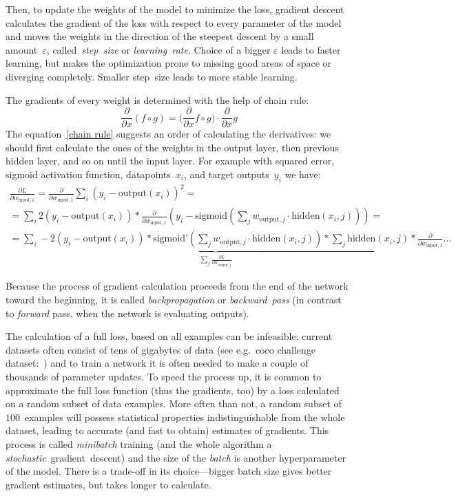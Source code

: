Then, to update the weights of the model to minimize the loss, gradient descent calculates the gradient of the loss with respect to every parameter of the model and moves the weights in the direction of the steepest descent by a small amount~$\varepsilon$, called~\emph{step~size} or \emph{learning~rate}. Choice of a bigger $\varepsilon$ leads to faster learning, but makes the optimization prone to missing good areas of space or diverging completely. Smaller step~size leads to more stable
learning.

The gradients of every weight is determined with the help of chain rule:
\begin{equation}\label{chain rule}
  \frac{\partial}{\partial x} (f \circ g) = (\frac{\partial}{\partial x} f \circ g\big) \cdot \frac{\partial}{\partial x}g
\end{equation}
The equation~\eqref{chain rule} suggests an order of calculating the derivatives: we should first calculate the ones of the weights in the output layer, then previous hidden layer, and so on until the input layer. For example with squared error, sigmoid activation function, datapoints~$x_i$, and target outputs~$y_i$ we have:
\begin{multline}
  \frac{\partial L}{\partial w_{\text{input}, 1}} = \frac{\partial}{\partial w_{\text{input}, 1}} \sum_{i} (y_i - \text{output}(x_i))^2 =\\=  \sum_{i} 2(y_i - \text{output}(x_i)) * \frac{\partial}{\partial w_{\text{input}, 1}}
  ( y_i - \text{sigmoid}(\sum_j w_{\text{output}, j} \cdot \text{hidden}(x_i, j))) =\\=
  \underbrace{\sum_{i} -2(y_i - \text{output}(x_i)) * \text{sigmoid'}(\sum_j w_{\text{output}, j} \cdot \text{hidden}(x_i, j)) * \sum_j \text{hidden}(x_i, j)}_{\sum_j \frac{\partial L}{\partial w_{\text{output}, j}}} * \frac{\partial}{\partial w_{\text{input}, 1}}\ldots
\end{multline}

Because the process of gradient calculation proceeds from the end of the network toward the beginning, it is called \emph{backpropagation} or \emph{backward~pass} (in contrast to \emph{forward} pass, when the network is evaluating outputs).

The calculation of a full loss, based on all examples can be infeasible: current datasets often consist of tens of gigabytes of data (see e.g.~coco challenge dataset:~\cite{coco-dataset}) and to train a network it is often needed to make a couple of thousands of parameter updates.
To speed the process up, it is common to approximate the full loss function (thus the gradients, too) by a loss calculated on a random subset of data examples. More often than not, a random subset of $100$~examples will possess statistical properties indistinguishable from the whole dataset, leading to accurate (and fast to obtain) estimates of gradients. This process is called \emph{minibatch} training (and the whole algorithm a \emph{stochastic}~gradient~descent) and the size of the \emph{batch} is another hyperparameter of the model. There is a trade-off in its choice---bigger batch size gives better gradient estimates, but takes longer to calculate.

